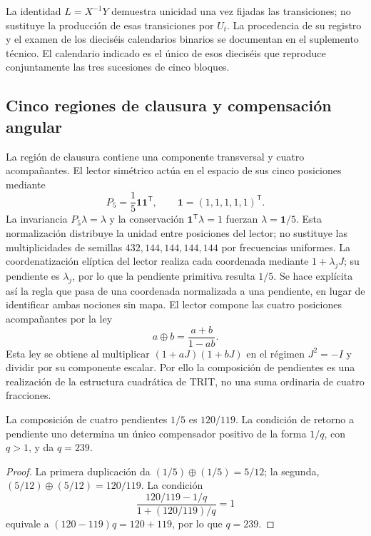 La identidad \(L=X^{-1}Y\) demuestra unicidad una vez fijadas las transiciones; no sustituye la producción de esas transiciones por \(U_t\). La procedencia de su registro y el examen de los dieciséis calendarios binarios se documentan en el suplemento técnico. El calendario indicado es el único de esos dieciséis que reproduce conjuntamente las tres sucesiones de cinco bloques.



\subsection{Cinco regiones de clausura y compensación angular}

La región de clausura contiene una componente transversal y cuatro acompañantes. El lector simétrico actúa en el espacio de sus cinco posiciones mediante
\[
 P_5=\frac15\mathbf1\mathbf1^{\mathsf T},\qquad
 \mathbf1=(1,1,1,1,1)^{\mathsf T}.
\]
La invariancia \(P_5\lambda=\lambda\) y la conservación \(\mathbf1^{\mathsf T}\lambda=1\) fuerzan \(\lambda=\mathbf1/5\). Esta normalización distribuye la unidad entre posiciones del lector; no sustituye las multiplicidades de semillas \(432,144,144,144,144\) por frecuencias uniformes. La coordenatización elíptica del lector realiza cada coordenada mediante \(1+\lambda_jJ\); su pendiente es \(\lambda_j\), por lo que la pendiente primitiva resulta \(1/5\). Se hace explícita así la regla que pasa de una coordenada normalizada a una pendiente, en lugar de identificar ambas nociones sin mapa. El lector compone las cuatro posiciones acompañantes por la ley
\begin{equation}
 a\oplus b=\frac{a+b}{1-ab}.
 \label{eq:suma-pendientes}
\end{equation}
Esta ley se obtiene al multiplicar \((1+aJ)(1+bJ)\) en el régimen \(J^2=-I\) y dividir por su componente escalar. Por ello la composición de pendientes es una realización de la estructura cuadrática de TRIT, no una suma ordinaria de cuatro fracciones.

\begin{proposition}
La composición de cuatro pendientes \(1/5\) es \(120/119\). La condición de retorno a pendiente uno determina un único compensador positivo de la forma \(1/q\), con \(q>1\), y da \(q=239\).
\end{proposition}
\begin{proof}
La primera duplicación da \((1/5)\oplus(1/5)=5/12\); la segunda, \((5/12)\oplus(5/12)=120/119\). La condición
\[
 \frac{120/119-1/q}{1+(120/119)/q}=1
\]
equivale a \((120-119)q=120+119\), por lo que \(q=239\).
\end{proof}

